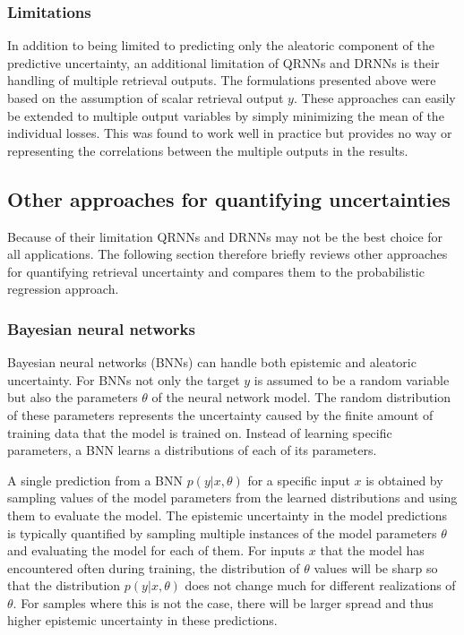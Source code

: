 \subsubsection{Limitations}

In addition to being limited to predicting only the aleatoric component of the
predictive uncertainty, an additional limitation of QRNNs and DRNNs is their
handling of multiple retrieval outputs. The formulations presented above were
based on the assumption of scalar retrieval output $y$. These approaches can
easily be extended to multiple output variables by simply minimizing the mean of
the individual losses. This was found to work well in practice but provides no
way or representing the correlations between the multiple outputs in the
results. 

\subsection{Other approaches for quantifying uncertainties}

Because of their limitation QRNNs and DRNNs may not be the best choice for all
applications. The following section therefore briefly reviews other approaches
for quantifying retrieval uncertainty and compares them to the probabilistic
regression approach.

\subsubsection{Bayesian neural networks}

Bayesian neural networks (BNNs) can handle both epistemic and aleatoric
uncertainty. For BNNs not only the target $y$ is assumed to be a random variable
but also the parameters $\theta$ of the neural network model. The random
distribution of these parameters represents the uncertainty caused by the finite
amount of training data that the model is trained on. Instead of learning
specific parameters, a BNN learns a distributions of each of its parameters.

A single prediction from a BNN $p(y|x, \theta)$ for a specific input $x$ is
obtained by sampling values of the model parameters from the learned
distributions and using them to evaluate the model. The epistemic uncertainty
in the model predictions is typically quantified by sampling multiple instances
of the model parameters $\theta$ and evaluating the model for each of them. For
inputs $x$ that the model has encountered often during training, the
distribution of $\theta$ values will be sharp so that the distribution $p(y|x,
\theta)$ does not change much for different realizations of $\theta$. For
samples where this is not the case, there will be larger spread and thus higher
epistemic uncertainty in these predictions.

